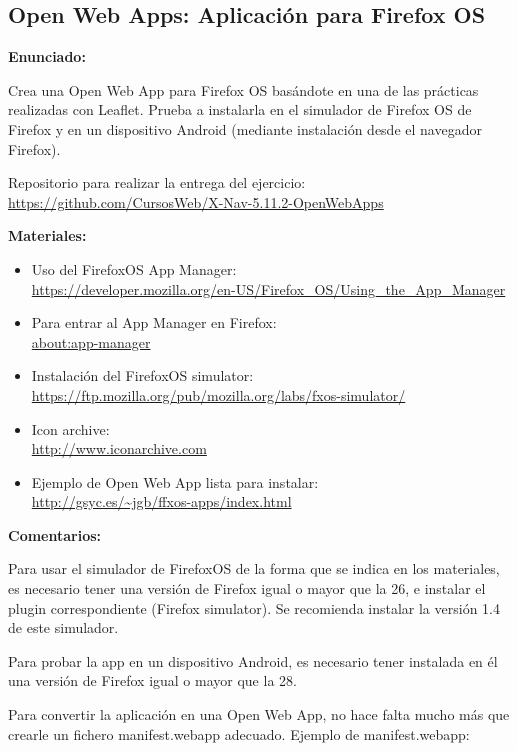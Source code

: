 \subsection{Open Web Apps: Aplicación para Firefox OS}
\label{subsec:apis-ffxos}

\textbf{Enunciado:}

Crea una Open Web App para Firefox OS basándote en una de las prácticas realizadas con Leaflet. Prueba a instalarla en el simulador de Firefox OS de Firefox y en un dispositivo Android (mediante instalación desde el navegador Firefox).

Repositorio para realizar la entrega del ejercicio: \\
\url{https://github.com/CursosWeb/X-Nav-5.11.2-OpenWebApps}


\textbf{Materiales:}

\begin{itemize}
\item Uso del FirefoxOS App Manager: \\
  \url{https://developer.mozilla.org/en-US/Firefox_OS/Using_the_App_Manager}
\item Para entrar al App Manager en Firefox: \\
  \url{about:app-manager}
\item Instalación del FirefoxOS simulator: \\
  \url{https://ftp.mozilla.org/pub/mozilla.org/labs/fxos-simulator/}
\item Icon archive: \\
  \url{http://www.iconarchive.com}
\item Ejemplo de Open Web App lista para instalar: \\
  \url{http://gsyc.es/~jgb/ffxos-apps/index.html}
\end{itemize}

\textbf{Comentarios:}

Para usar el simulador de FirefoxOS de la forma que se indica en los materiales, es necesario tener una versión de Firefox igual o mayor que la 26, e instalar el plugin correspondiente (Firefox simulator). Se recomienda instalar la versión 1.4 de este simulador.

Para probar la app en un dispositivo Android, es necesario tener instalada en él una versión de Firefox igual o mayor que la 28.

Para convertir la aplicación en una Open Web App, no hace falta mucho más que crearle un fichero manifest.webapp adecuado. Ejemplo de manifest.webapp:

